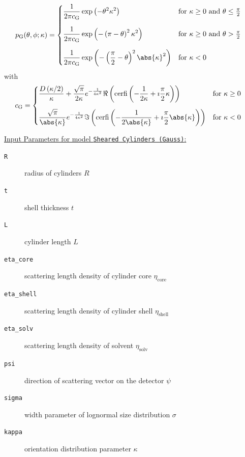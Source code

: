 \begin{align}
p_\mathrm{G}(\theta,\phi;\kappa) & =
\begin{cases}
\displaystyle
\frac{1}{2\pi c_\mathrm{G}}\exp\left(-\theta^2\kappa^2\right) & \mathrm{for~} \kappa \geq 0 \mathrm{~and~} \theta \leq \frac{\pi}{2}\\[5mm]
\displaystyle
\frac{1}{2\pi c_\mathrm{G}}\exp\left(-\left(\pi-\theta\right)^2\kappa^2\right) & \mathrm{for~} \kappa \geq 0 \mathrm{~and~} \theta > \frac{\pi}{2}\\[5mm]
\displaystyle
\frac{1}{2\pi c_\mathrm{G}}\exp\left(-\left(\frac{\pi}{2}-\theta\right)^2\abs{\kappa}^2\right) & \mathrm{for~} \kappa < 0
\end{cases}
\end{align}
with
\begin{align}
c_\mathrm{G} & =
\begin{cases}\displaystyle
\frac{D\left(\kappa/2\right)}{\kappa}
           +\frac{\sqrt{\pi}}{2\kappa} e^{-\frac{1}{4\kappa^2}} \Re\left(\mathrm{cerfi}\left(-\frac{1}{2\kappa}+\imath\frac{\pi}{2}\kappa\right) \right)& \mathrm{for~} \kappa \geq 0 \\[5mm]
\displaystyle
\frac{\sqrt{\pi}}{\abs{\kappa}} e^{-\frac{1}{4\kappa^2}} \Im\left(\mathrm{cerfi}\left(-\frac{1}{2\abs{\kappa}}+\imath\frac{\pi}{2}\abs{\kappa}\right) \right) & \mathrm{for~} \kappa < 0
\end{cases}
\end{align}

\vspace{5mm}

\underline{Input Parameters for model \texttt{Sheared Cylinders (Gauss)}:}\\
\begin{description}
\item[\texttt{R}] radius of cylinders $R$
\item[\texttt{t}] shell thickness $t$
\item[\texttt{L}] cylinder length $L$
\item[\texttt{eta\_core}] scattering length density of cylinder core $\eta_\mathrm{core}$
\item[\texttt{eta\_shell}] scattering length density of cylinder shell $\eta_\mathrm{shell}$
\item[\texttt{eta\_solv}] scattering length density of solvent $\eta_\mathrm{solv}$
\item[\texttt{psi}] direction of scattering vector on the detector $\psi$
\item[{\texttt{sigma}}] width parameter of lognormal size distribution $\sigma$
\item[{\texttt{kappa}}] orientation distribution parameter $\kappa$
\end{description}

